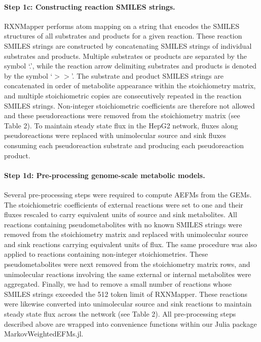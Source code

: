 \documentclass[12pt]{article}
\begin{document}
\paragraph{Step 1c: Constructing reaction SMILES strings.}

RXNMapper performs atom mapping on a string that encodes the SMILES
structures of all substrates and products for a given reaction. These
reaction SMILES strings are constructed by concatenating SMILES strings of
individual substrates and products. Multiple substrates or products are
separated by the symbol `.', while the reaction arrow delimiting
substrates and products is denoted by the symbol `$>>$'. The substrate and
product SMILES strings are concatenated in order of metabolite appearance
within the stoichiometry matrix, and multiple stoichiometric copies are
consecutively repeated in the reaction SMILES strings. Non-integer
stoichiometric coefficients are therefore not allowed and these
pseudoreactions were removed from the stoichiometry matrix (see Table 2).
To maintain steady state flux in the HepG2 network, fluxes along
pseudoreactions were replaced with unimolecular source and sink fluxes
consuming each pseudoreaction substrate and producing each pseudoreaction
product.

\paragraph{Step 1d: Pre-processing genome-scale metabolic models.}

Several pre-processing steps were required to compute AEFMs from the GEMs.
The stoichiometric coefficients of external reactions were set to one and
their fluxes rescaled to carry equivalent units of source and sink
metabolites. All reactions containing pseudometabolites with no known
SMILES strings were removed from the stoichiometry matrix and replaced
with unimolecular source and sink reactions carrying equivalent units of
flux. The same procedure was also applied to reactions containing
non-integer stoichiometries. These pseudometabolites were next removed
from the stoichiometry matrix rows, and unimolecular reactions involving
the same external or internal metabolites were aggregated. Finally, we had
to remove a small number of reactions whose SMILES strings exceeded the
512 token limit of RXNMapper. These reactions were likewise converted into
unimolecular source and sink reactions to maintain steady state flux
across the network (see Table 2). All pre-processing steps described above
are wrapped into convenience functions within our Julia package
MarkovWeightedEFMs.jl.
\end{document}
